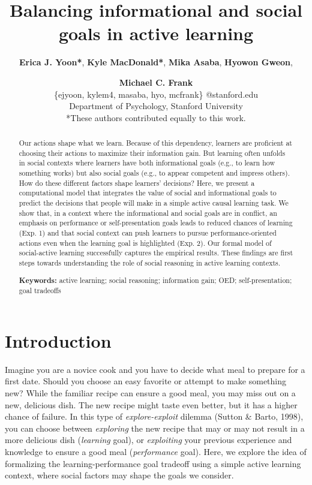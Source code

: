 \documentclass[10pt, letterpaper]{article}
\title{Balancing informational and social goals in active learning}
\author{{\large \bf Erica J. Yoon*}, {\large \bf Kyle MacDonald*}, {\large \bf Mika Asaba}, {\large \bf Hyowon Gweon}, \and {\large \bf Michael C. Frank} \\ \{ejyoon, kylem4, masaba, hyo, mcfrank\} @stanford.edu \\ Department of Psychology, Stanford University \\ *These authors contributed equally to this work.}
\begin{document}
\maketitle

\begin{abstract}
Our actions shape what we learn. Because of this dependency, learners
are proficient at choosing their actions to maximize their information
gain. But learning often unfolds in social contexts where learners have
both informational goals (e.g., to learn how something works) but also
social goals (e.g., to appear competent and impress others). How do
these different factors shape learners' decisions? Here, we present a
computational model that integrates the value of social and
informational goals to predict the decisions that people will make in a
simple active causal learning task. We show that, in a context where the
informational and social goals are in conflict, an emphasis on
performance or self-presentation goals leads to reduced chances of
learning (Exp. 1) and that social context can push learners to pursue
performance-oriented actions even when the learning goal is highlighted
(Exp. 2). Our formal model of social-active learning successfully
captures the empirical results. These findings are first steps towards
understanding the role of social reasoning in active learning contexts.

\textbf{Keywords:}
active learning; social reasoning; information gain; OED;
self-presentation; goal tradeoffs
\end{abstract}

\section{Introduction}\label{introduction}

Imagine you are a novice cook and you have to decide what meal to
prepare for a first date. Should you choose an easy favorite or attempt
to make something new? While the familiar recipe can ensure a good meal,
you may miss out on a new, delicious dish. The new recipe might taste
even better, but it has a higher chance of failure. In this type of
\emph{explore-exploit} dilemma (Sutton \& Barto, 1998), you can choose
between \emph{exploring} the new recipe that may or may not result in a
more delicious dish (\emph{learning} goal), or \emph{exploiting} your
previous experience and knowledge to ensure a good meal
(\emph{performance} goal). Here, we explore the idea of formalizing the
learning-performance goal tradeoff using a simple active learning
context, where social factors may shape the goals we consider.
\end{document}

